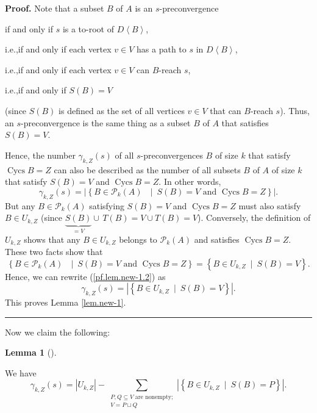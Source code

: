 \documentclass[numbers=enddot,12pt,final,onecolumn,notitlepage]{scrartcl}%
\theoremstyle{definition}
\newtheorem{lem}[theo]{Lemma}
\newenvironment{lemma}[1][]
{\begin{lem}[#1]\begin{leftbar}}
{\end{leftbar}\end{lem}}
\newenvironment{proof}[1][Proof]{\noindent\textbf{#1.} }{\ \rule{0.5em}{0.5em}}
\let\sumnonlimits\sum
\renewcommand{\sum}{\sumnonlimits\limits}
\theoremstyle{plainsl}
\begin{document}
\begin{proof}
Note that a subset $B$ of $A$ is an $s$-preconvergence

\qquad\qquad if and only if $s$ is a to-root of $D\left\langle B\right\rangle
$,

\qquad i.e.,\quad if and only if each vertex $v\in V$ has a path to $s$ in
$D\left\langle B\right\rangle $,

\qquad i.e.,\quad if and only if each vertex $v\in V$ can $B$-reach $s$,

\qquad i.e.,\quad if and only if $S\left(  B\right)  =V$

\noindent(since $S\left(  B\right)  $ is defined as the set of all vertices
$v\in V$ that can $B$-reach $s$). Thus, an $s$-preconvergence is the same
thing as a subset $B$ of $A$ that satisfies $S\left(  B\right)  =V$.

Hence, the number $\gamma_{k,Z}\left(  s\right)  $ of all $s$-preconvergences
$B$ of size $k$ that satisfy $\operatorname*{Cycs}B=Z$ can also be described
as the number of all subsets $B$ of $A$ of size $k$ that satisfy $S\left(
B\right)  =V$ and $\operatorname*{Cycs}B=Z$. In other words,%
\begin{equation}
\gamma_{k,Z}\left(  s\right)  =\left\vert \left\{  B\in\mathcal{P}_{k}\left(
A\right)  \text{ }\mid\ S\left(  B\right)  =V\text{ and }\operatorname*{Cycs}%
B=Z\right\}  \right\vert . \label{pf.lem.new-1.2}%
\end{equation}
But any $B\in\mathcal{P}_{k}\left(  A\right)  $ satisfying $S\left(  B\right)
=V$ and $\operatorname*{Cycs}B=Z$ must also satisfy $B\in U_{k,Z}$ (since
$\underbrace{S\left(  B\right)  }_{=V}\cup\,T\left(  B\right)  =V\cup T\left(
B\right)  =V$). Conversely, the definition of $U_{k,Z}$ shows that any $B\in
U_{k,Z}$ belongs to $\mathcal{P}_{k}\left(  A\right)  $ and satisfies
$\operatorname*{Cycs}B=Z$. These two facts show that%
\[
\left\{  B\in\mathcal{P}_{k}\left(  A\right)  \text{ }\mid\ S\left(  B\right)
=V\text{ and }\operatorname*{Cycs}B=Z\right\}  =\left\{  B\in U_{k,Z}%
\ \mid\ S\left(  B\right)  =V\right\}  .
\]
Hence, we can rewrite (\ref{pf.lem.new-1.2}) as
\[
\gamma_{k,Z}\left(  s\right)  =\left\vert \left\{  B\in U_{k,Z}\ \mid
\ S\left(  B\right)  =V\right\}  \right\vert .
\]
This proves Lemma \ref{lem.new-1}.
\end{proof}

Now we claim the following:

\begin{lemma}
\label{lem.new1} We have%
\[
\gamma_{k,Z}\left(  s\right)  =\left\vert U_{k,Z}\right\vert -\sum
_{\substack{P,Q\subseteq V\text{ are nonempty;}\\V=P\sqcup Q}}\left\vert
\left\{  B\in U_{k,Z}\ \mid\ S\left(  B\right)  =P\right\}  \right\vert .
\]

\end{lemma}
\end{document}
